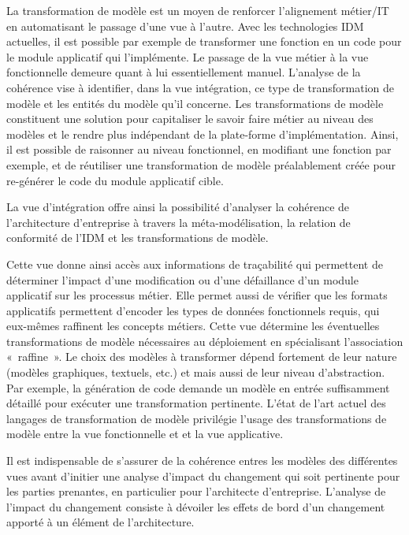 La transformation de modèle est un moyen de renforcer l'alignement métier/IT en automatisant le passage d'une vue
à l'autre. Avec les technologies IDM actuelles, il est possible par exemple de transformer une fonction en un code pour
le module applicatif qui l'implémente. Le passage de la vue métier à la vue fonctionnelle demeure quant à lui essentiellement
manuel. L'analyse de la cohérence vise à identifier, dans la vue intégration, ce type de transformation de modèle
et les entités du modèle qu'il concerne.
Les transformations de modèle constituent une solution pour capitaliser le savoir faire métier au niveau des modèles et le rendre
plus indépendant de la plate-forme d'implémentation. Ainsi, il est possible de raisonner au niveau fonctionnel, en modifiant une fonction par exemple, et de réutiliser une transformation de modèle préalablement créée pour re-générer le code du module applicatif cible.

La vue d'intégration offre ainsi la possibilité d'analyser la cohérence de l'architecture d'entreprise
à travers la méta-modélisation, la relation de conformité de l'IDM et les transformations de modèle.

Cette vue donne ainsi accès aux informations de traçabilité qui
permettent de déterminer l'impact d'une modification ou d'une défaillance d'un
module applicatif sur les processus métier. Elle permet aussi de vérifier que
les formats applicatifs permettent d'encoder les types de données fonctionnels
requis, qui eux-mêmes raffinent les concepts métiers. Cette vue détermine les
éventuelles transformations de modèle nécessaires au déploiement en spécialisant
l'association «~raffine~». Le choix des modèles à transformer dépend fortement
de leur nature (modèles graphiques, textuels, etc.) et mais aussi de leur niveau
d'abstraction. Par exemple, la génération de code demande un modèle en entrée
suffisamment détaillé pour exécuter une transformation pertinente. L'état de
l'art actuel des langages de transformation de modèle privilégie l'usage des
transformations de modèle entre la vue fonctionnelle et et la vue applicative.


Il est indispensable de s'assurer de la cohérence
entres les modèles des différentes vues avant d'initier une analyse
d'impact du changement qui soit pertinente pour les parties prenantes, en particulier
pour l'architecte d'entreprise. L'analyse de l'impact du
changement consiste à dévoiler les effets de bord d'un changement apporté à un
élément de l'architecture.

